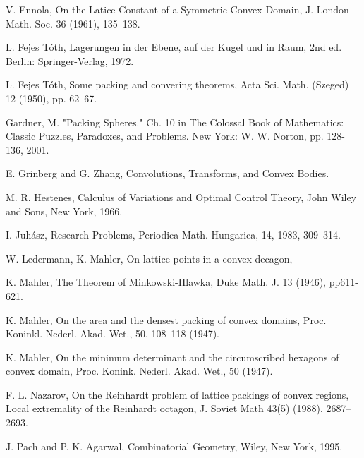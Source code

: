 \documentclass[11pt]{amsart}
\begin{document}
\begin{thebibliography}{}



  V. Ennola, On the Latice Constant of a Symmetric Convex
Domain, J. London Math. Soc. 36 (1961), 135--138.

 L. 
Fejes T\'oth,  Lagerungen in der Ebene, auf der Kugel und in Raum, 2nd ed. Berlin: Springer-Verlag, 1972.

 L. Fejes T\'oth, Some packing and convering theorems, Acta Sci. Math.
(Szeged) 12 (1950), pp. 62--67.

 Gardner, M. "Packing Spheres." Ch. 10 in The Colossal Book of Mathematics: Classic Puzzles, Paradoxes, and Problems. New York: W. W. Norton, pp. 128-136, 2001.

 E. Grinberg and G. Zhang, Convolutions, Transforms, and Convex Bodies.

 M. R. Hestenes, Calculus of Variations and Optimal Control Theory, John Wiley and Sons, New York, 1966.

 I. Juh\'asz, Research Problems, Periodica Math. Hungarica,
14, 1983, 309--314. 

  W. Ledermann, K. Mahler, On lattice points in a convex
decagon,  %

  K. Mahler, The Theorem of Minkowski-Hlawka, Duke Math. J. 13 (1946), pp611-621.

  K. Mahler, On the area and the densest packing of convex domains,
Proc. Koninkl. Nederl. Akad. Wet., 50, 108--118 (1947).

 K. Mahler, On the minimum determinant and the circumscribed hexagons of convex domain, Proc. Konink. Nederl. Akad. Wet., 50 (1947).

  F. L. Nazarov, On the Reinhardt problem of lattice packings
of convex regions, Local extremality of the Reinhardt octagon,
J. Soviet Math 43(5) (1988), 2687--2693.


 J. Pach and P. K. Agarwal, Combinatorial Geometry, Wiley, New York, 1995.


\end{thebibliography}
\end{document}
